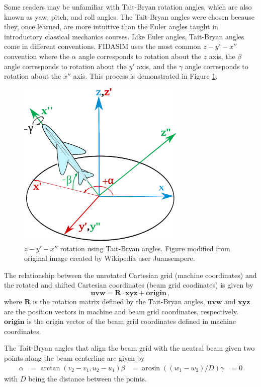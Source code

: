 Some readers may be unfamiliar with Tait-Bryan rotation angles, which are also known as yaw, pitch, and roll angles. The Tait-Bryan angles were chosen because they, once learned, are more intuitive than the Euler angles taught in introductory classical mechanics courses. Like Euler angles, Tait-Bryan angles come in different conventions. FIDASIM uses the most common $z-y'-x''$ convention where the $\alpha$ angle corresponds to rotation about the $z$ axis, the $\beta$ angle corresponds to rotation about the $y'$ axis, and the $\gamma$ angle corresponds to rotation about the $x''$ axis. This process is demonstrated in Figure \ref{fig:tait_bryan}.
\begin{figure}[h!]
    \centering
    \includegraphics[width=8cm]{figures/tait_bryan.eps}
    \caption{$z-y'-x''$ rotation using Tait-Bryan angles. Figure modified from original image created by Wikipedia user Juansempere.}
    \label{fig:tait_bryan}
\end{figure}

The relationship between the unrotated Cartesian grid (machine coordinates) and the rotated and shifted Cartesian coordinates (beam grid coodinates) is given by
\begin{equation}\label{eq:xyz_to_uvw}
    \mathbf{uvw} = \mathbf{R}\cdot \mathbf{xyz} + \mathbf{origin}\,,
\end{equation}
where $\mathbf{R}$ is the rotation matrix defined by the Tait-Bryan angles, $\mathbf{uvw}$ and $\mathbf{xyz}$ are the position vectors in machine and beam grid coordinates, respectively. $\mathbf{origin}$ is the origin vector of the beam grid coordinates defined in machine coordinates.

The Tait-Bryan angles that align the beam grid with the neutral beam given two points along the beam centerline are given by
\begin{equation}
\begin{split}
    \alpha &= \arctan(v_2 - v_1,u_2 - u_1)
    \beta  &= \arcsin((w_1 - w_2)/D)
    \gamma &= 0
\end{split}
\end{equation}
with $D$ being the distance between the points.

